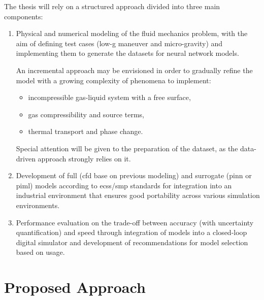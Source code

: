 \documentclass[12pt]{article}
\begin{document}
	The thesis will rely on a structured approach divided into three main components:
	\begin{enumerate}
		\item Physical and numerical modeling of the fluid mechanics problem, with the aim of defining test cases (low-g maneuver and micro-gravity) and implementing them to generate the datasets for neural network models.
		
		An incremental approach may be envisioned in order to gradually refine the model with a growing complexity of phenomena to implement:
		\begin{itemize}
			\item incompressible gas-liquid system with a free surface,
			\item gas compressibility and source terms,
			\item thermal transport and phase change.
		\end{itemize}
		
		Special attention will be given to the preparation of the dataset, as the data-driven approach strongly relies on it.
		
		\item Development of full (\acrshort{cfd} base on previous modeling)  and surrogate (\acrshort{pinn} or \acrshort{piml}) models according to \acrshort{ecss}/\acrshort{smp} standards for integration into an industrial environment that ensures good portability across various simulation environments.
		
		\item Performance evaluation on the trade-off between accuracy (with uncertainty quantification) and speed through integration of models into a closed-loop digital simulator and development of recommendations for model selection based on usage.
	\end{enumerate}
	
	\section*{Proposed Approach}
	
\end{document}
